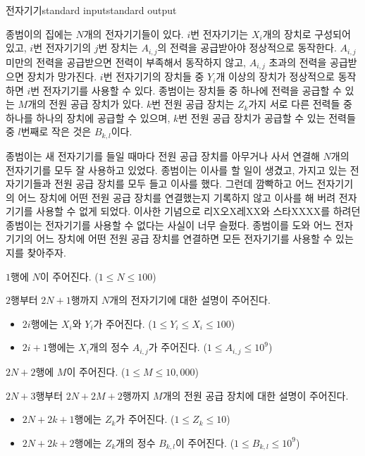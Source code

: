 \begin{problem}{전자기기}{standard input}{standard output}

종범이의 집에는 $N$개의 전자기기들이 있다. $i$번 전자기기는 $X_i$개의 장치로 구성되어 있고, $i$번 전자기기의 $j$번 장치는 $A_{i,j}$의 전력을 공급받아야 정상적으로 동작한다. $A_{i,j}$ 미만의 전력을 공급받으면 전력이 부족해서 동작하지 않고, $A_{i,j}$ 초과의 전력을 공급받으면 장치가 망가진다. $i$번 전자기기의 장치들 중 $Y_i$개 이상의 장치가 정상적으로 동작하면 $i$번 전자기기를 사용할 수 있다. 종범이는 장치들 중 하나에 전력을 공급할 수 있는 $M$개의 전원 공급 장치가 있다. $k$번 전원 공급 장치는 $Z_k$가지 서로 다른 전력들 중 하나를 하나의 장치에 공급할 수 있으며, $k$번 전원 공급 장치가 공급할 수 있는 전력들 중 $l$번째로 작은 것은 $B_{k,l}$이다.

종범이는 새 전자기기를 들일 때마다 전원 공급 장치를 아무거나 사서 연결해 $N$개의 전자기기를 모두 잘 사용하고 있었다. 종범이는 이사를 할 일이 생겼고, 가지고 있는 전자기기들과 전원 공급 장치를 모두 들고 이사를 했다. 그런데 깜빡하고 어느 전자기기의 어느 장치에 어떤 전원 공급 장치를 연결했는지 기록하지 않고 이사를 해 버려 전자기기를 사용할 수 없게 되었다. 이사한 기념으로 리X오X레XX와 스타XXXX를 하려던 종범이는 전자기기를 사용할 수 없다는 사실이 너무 슬펐다. 종범이를 도와 어느 전자기기의 어느 장치에 어떤 전원 공급 장치를 연결하면 모든 전자기기를 사용할 수 있는지를 찾아주자.

\InputFile
$1$행에 $N$이 주어진다. ($1 \le N \le 100$)

$2$행부터 $2N+1$행까지 $N$개의 전자기기에 대한 설명이 주어진다.

\begin{itemize}
\item $2i$행에는 $X_i$와 $Y_i$가 주어진다. ($1 \le Y_i \le X_i \le 100$)
\item $2i+1$행에는 $X_i$개의 정수 $A_{i,j}$가 주어진다. ($1 \le A_{i,j} \le 10^9$)
\end{itemize}

$2N+2$행에 $M$이 주어진다. ($1 \le M \le 10,000$)

$2N+3$행부터 $2N+2M+2$행까지 $M$개의 전원 공급 장치에 대한 설명이 주어진다.

\begin{itemize}
\item $2N+2k+1$행에는 $Z_k$가 주어진다. ($1 \le Z_k \le 10$)
\item $2N+2k+2$행에는 $Z_k$개의 정수 $B_{k,l}$이 주어진다. ($1 \le B_{k,l} \le 10^9$)
\end{itemize}


\end{problem}
